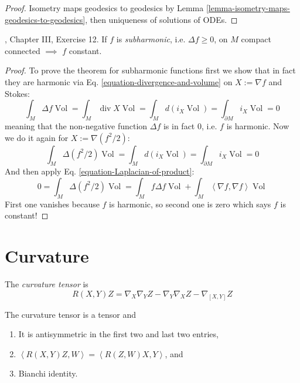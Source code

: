 \begin{proof}
Isometry maps geodesics to geodesics by Lemma 
\ref{lemma-isometry-maps-geodesics-to-geodesics}, then uniqueness of solutions
of ODEs.
\end{proof}


\begin{exercise}
\label{exercise-maximum-principle}
\cite{doc}, Chapter III, Exercise 12. If $f$ is {\it subharmonic}, i.e. 
$\Delta f\geq 0$, on $M$ 
compact connected $\implies$ $f$ constant.
\end{exercise}

\begin{proof}
To prove the theorem for subharmonic functions first we show that in fact they
are harmonic via Eq. \ref{equation-divergence-and-volume} 
on $X:= \nabla f$ and Stokes:
$$
\int_M \Delta f \operatorname{Vol}=\int_M \operatorname{div}X \operatorname{Vol}
=\int_M d(i_X \operatorname{Vol})=\int_{\partial M}i_X \operatorname{Vol}=0
$$
meaning that the non-negative function $\Delta f$ is in fact 0, i.e. $f$ is
harmonic. Now we do it again for $X:=\nabla(f^2/2)$:
$$
\int_M \Delta(f^2/2)\operatorname{Vol}
=\int_M d(i_X \operatorname{Vol})
=\int_{\partial M}i_X \operatorname{Vol}
=0
$$
And then apply Eq. \ref{equation-Laplacian-of-product}:
$$
0=\int_M \Delta(f^2/2)\operatorname{Vol}
=\int_M f \Delta f \operatorname{Vol}
+\int_M \left<\nabla f,\nabla f\right>\operatorname{Vol}
$$
First one vanishes because $f$ is harmonic, so second one is zero which says
 $f$ is constant!
\end{proof}


\section{Curvature}
\label{section-curvature}

The {\it curvature tensor} is
\begin{equation}
\label{equation-curvature-tensor}
R(X,Y)Z=\nabla_X\nabla_YZ-\nabla_Y\nabla_XZ-\nabla_{[X,Y]}Z
\end{equation}

\begin{proposition}
\label{proposition-symmetries-of-curvature-tensor}
The curvature tensor is a tensor and
\begin{enumerate}
\item It is antisymmetric in the first two and last two entries,
\item $\left<R(X,Y)Z,W\right>=\left<R(Z,W)X,Y\right>$, and
\item Bianchi identity.
\end{enumerate}
\end{proposition}

